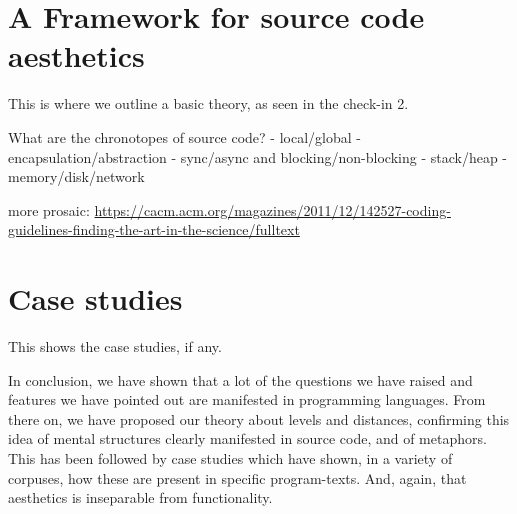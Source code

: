 \section{A Framework for source code aesthetics}
\label{sec:programming-aesthetic-framework}

This is where we outline a basic theory, as seen in the check-in 2.

What are the chronotopes of source code?
- local/global
- encapsulation/abstraction
- sync/async and blocking/non-blocking
- stack/heap
- memory/disk/network

more prosaic: \url{https://cacm.acm.org/magazines/2011/12/142527-coding-guidelines-finding-the-art-in-the-science/fulltext}

\section{Case studies}
\label{sec:case-studies}

This shows the case studies, if any.

\spacer


In conclusion, we have shown that a lot of the questions we have raised and features we have pointed out are manifested in programming languages. From there on, we have proposed our theory about levels and distances, confirming this idea of mental structures clearly manifested in source code, and of metaphors. This has been followed by case studies which have shown, in a variety of corpuses, how these are present in specific program-texts. And, again, that aesthetics is inseparable from functionality.